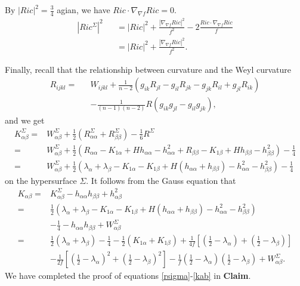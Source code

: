 \documentclass[12pt]{amsart}
\newcommand{\ban}{\begin{eqnarray*}}
\newcommand{\ean}{\end{eqnarray*}}
\begin{document}
	\smallskip
	By $|Ric|^2=\frac{3}{4}$ agian, we have $Ric\cdot\nabla_{\nabla f}Ric=0$.
	\ban
	|Ric^{\Sigma}|^2&&=|Ric|^2+\frac{|\nabla_{\nabla f} Ric|^2}{f^2}-2\frac{Ric\cdot\nabla_{\nabla f}Ric}{f}\\
	&&=|Ric|^2+\frac{|\nabla_{\nabla f} Ric|^2}{f^2}.
	\ean
	
	Finally, recall that the relationship between curvature and the Weyl curvature
	\ban
	R_{ijkl}=&&W_{ijkl}+{\frac{1}{n-2}}(g_{ik}R_{jl}-g_{il}R_{jk}-g_{jk}R_{il}+g_{jl}R_{ik})\\
	&&-{\frac{1}{(n-1)(n-2)}}R(g_{ik}g_{jl}-g_{il}g_{jk}),
	\ean
	and we get
	\begin{equation*}
	\begin{aligned}
	K^{\Sigma}_{\alpha \beta }=&W^{\Sigma}_{\alpha \beta }+{\frac{1}{2}}(R^{\Sigma}_{\alpha \alpha }+R^{\Sigma}_{\beta \beta})-{\frac{1}{6}}R^{\Sigma}\\
	=&W^{\Sigma}_{\alpha \beta }+{\frac{1}{2}}(R_{\alpha \alpha}-K_{1\alpha }+Hh_{\alpha \alpha}-h_{\alpha \alpha}^2+R_{\beta \beta}-K_{1\beta}+Hh_{\beta \beta }-h_{\beta \beta}^2)-{\frac{1}{4}}\\
	=&W^{\Sigma}_{\alpha \beta }+{\frac{1}{2}}\left(\lambda_{\alpha}+\lambda_{\beta}-K_{1\alpha }-K_{1\beta  }+H(h_{\alpha \alpha}+h_{\beta \beta })-h_{\alpha \alpha}^2-h_{\beta \beta}^2\right)-{\frac{1}{4}}
	\end{aligned}
	\end{equation*}
	on the  hypersurface $\Sigma$. It follows from the Gauss equation that
	\begin{equation*}
	\begin{aligned}
	K_{\alpha \beta }=&K^{\Sigma}_{\alpha \beta }-h_{\alpha \alpha}h_{\beta \beta}+h_{\alpha \beta }^2\\
	=&{\frac{1}{2}}\left(\lambda_{\alpha}+\lambda_{\beta}-K_{1\alpha }-K_{1\beta }+H(h_{\alpha \alpha}+h_{\beta \beta })-h_{\alpha \alpha}^2-h_{\beta \beta}^2\right)\\
	&-{\frac{1}{4}}-h_{\alpha \alpha}h_{\beta \beta}+W^{\Sigma}_{\alpha \beta }\\
	=&{\frac{1}{2}}(\lambda_{\alpha}+\lambda_{\beta})-{\frac{1}{4}}-{\frac{1}{2}}(K_{1\alpha }+K_{1\beta  })+{\frac{1}{4f}}[({\frac{1}{2}}-\lambda_{\alpha })+({\frac{1}{2}}-\lambda_{\beta})]\\
	&- {\frac{1}{2f}}\left[ ({\frac{1}{2}}-\lambda_{\alpha})^2+({\frac{1}{2}}-\lambda_{\beta})^2\right]  -{\frac{1}{f}}({\frac{1}{2}}-\lambda_{\alpha})({\frac{1}{2}}-\lambda_{\beta})+W^{\Sigma}_{\alpha \beta }.
	\end{aligned}
	\end{equation*}
	We have completed the proof of equations \eqref{rsigma}-\eqref{kab} in \textbf{Claim}.\\
	
\end{document}
